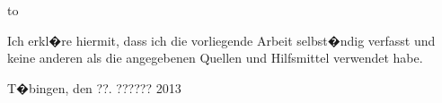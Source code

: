 \thispagestyle{empty}
\vspace*{42\baselineskip}
\hbox to \textwidth{\hrulefill}
\par
Ich erkl�re hiermit, dass ich die vorliegende Arbeit selbst�ndig verfasst und
keine anderen als die angegebenen Quellen und Hilfsmittel verwendet habe.

T�bingen, den ??. ?????? 2013

\clearpage







